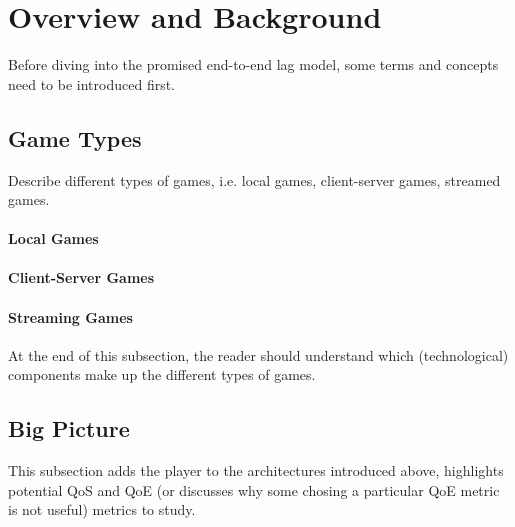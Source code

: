 \section{Overview and Background}
\label{sec:background}

Before diving into the promised end-to-end lag model, some terms and concepts need to be introduced first.


\subsection{Game Types}
Describe different types of games, i.e. local games, client-server games, streamed games.


\paragraph*{Local Games}

\paragraph*{Client-Server Games}

\paragraph*{Streaming Games}

At the end of this subsection, the reader should understand which (technological) components make up the different types of games.

\subsection{Big Picture}

This subsection adds the player to the architectures introduced above, highlights potential QoS and QoE (or discusses why some chosing a particular QoE metric is not useful) metrics to study.

